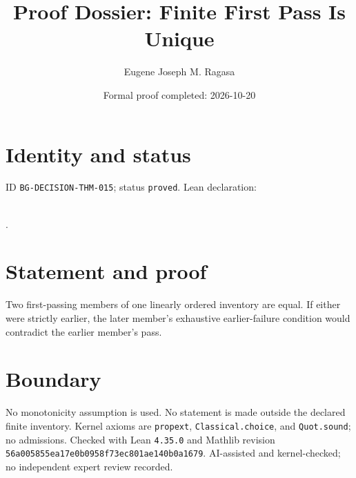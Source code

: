 \documentclass[11pt]{article}
\title{Proof Dossier: Finite First Pass Is Unique}\author{Eugene Joseph M. Ragasa}\date{Formal proof completed: 2026-10-20}
\begin{document}
\maketitle
\section{Identity and status}
ID \texttt{BG-DECISION-THM-015}; status \texttt{proved}. Lean declaration:
\par{}\\
{\tiny{}}.
\section{Statement and proof}
Two first-passing members of one linearly ordered inventory are equal. If either were
strictly earlier, the later member's exhaustive earlier-failure condition would
contradict the earlier member's pass.
\section{Boundary}
No monotonicity assumption is used. No statement is made outside the declared finite
inventory. Kernel axioms are \texttt{propext}, \texttt{Classical.choice}, and \texttt{Quot.sound}; no admissions. Checked with Lean \texttt{4.35.0} and Mathlib revision
\texttt{56a005855ea17e0b0958f73ec801ae140b0a1679}. AI-assisted and kernel-checked;
no independent expert review recorded.
\end{document}
